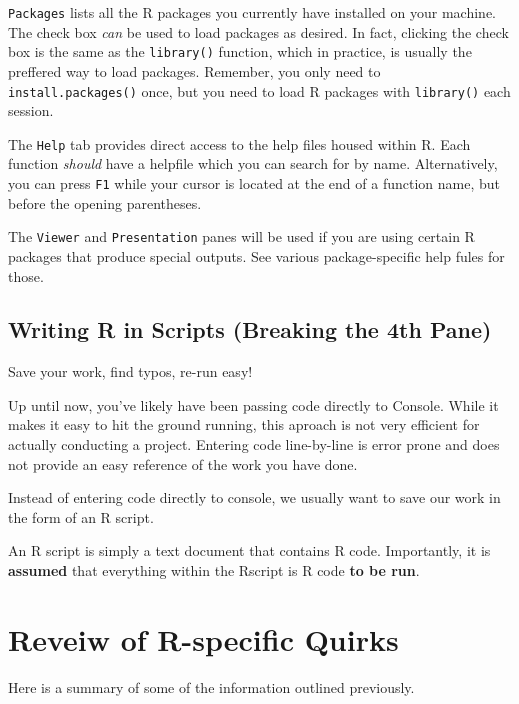 \documentclass[
]{book}
\begin{document}
\texttt{Packages} lists all the R packages you currently have installed on your machine. The check box \emph{can} be used to load packages as desired. In fact, clicking the check box is the same as the \texttt{library()} function, which in practice, is usually the preffered way to load packages. Remember, you only need to \texttt{install.packages()} once, but you need to load R packages with \texttt{library()} each session.

The \texttt{Help} tab provides direct access to the help files housed within R. Each function \emph{should} have a helpfile which you can search for by name. Alternatively, you can press \texttt{F1} while your cursor is located at the end of a function name, but before the opening parentheses.

The \texttt{Viewer} and \texttt{Presentation} panes will be used if you are using certain R packages that produce special outputs. See various package-specific help fules for those.

\hypertarget{writing-r-in-scripts-breaking-the-4th-pane}{%
\subsection{Writing R in Scripts (Breaking the 4th Pane)}\label{writing-r-in-scripts-breaking-the-4th-pane}}

Save your work, find typos, re-run easy!

Up until now, you've likely have been passing code directly to Console. While it makes it easy to hit the ground running, this aproach is not very efficient for actually conducting a project. Entering code line-by-line is error prone and does not provide an easy reference of the work you have done.

Instead of entering code directly to console, we usually want to save our work in the form of an R script.

An R script is simply a text document that contains R code. Importantly, it is \textbf{assumed} that everything within the Rscript is R code \textbf{to be run}.

\hypertarget{reveiw-of-r-specific-quirks}{%
\section*{Reveiw of R-specific Quirks}\label{reveiw-of-r-specific-quirks}}

Here is a summary of some of the information outlined previously.
\end{document}
